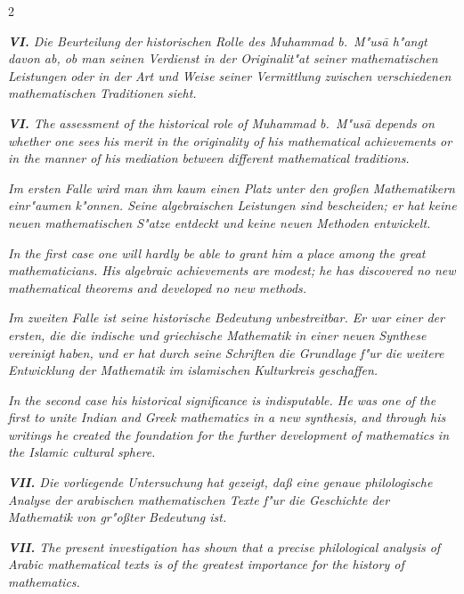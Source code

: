 \documentclass[10pt,a4paper]{article}
\begin{document}
\begin{paracol}{2}
\switchcolumn*

\textit{\textbf{VI.} Die Beurteilung der historischen Rolle des Muhammad b.\ M"us\=a h"angt davon ab, ob man seinen Verdienst in der Originalit"at seiner mathematischen Leistungen oder in der Art und Weise seiner Vermittlung zwischen verschiedenen mathematischen Traditionen sieht.}

\switchcolumn

\textit{\textbf{VI.} The assessment of the historical role of Muhammad b.\ M"us\=a depends on whether one sees his merit in the originality of his mathematical achievements or in the manner of his mediation between different mathematical traditions.}

\switchcolumn*

\textit{Im ersten Falle wird man ihm kaum einen Platz unter den gro\ss{}en Mathematikern einr"aumen k"onnen. Seine algebraischen Leistungen sind bescheiden; er hat keine neuen mathematischen S"atze entdeckt und keine neuen Methoden entwickelt.}

\switchcolumn

\textit{In the first case one will hardly be able to grant him a place among the great mathematicians. His algebraic achievements are modest; he has discovered no new mathematical theorems and developed no new methods.}

\switchcolumn*

\textit{Im zweiten Falle ist seine historische Bedeutung unbestreitbar. Er war einer der ersten, die die indische und griechische Mathematik in einer neuen Synthese vereinigt haben, und er hat durch seine Schriften die Grundlage f"ur die weitere Entwicklung der Mathematik im islamischen Kulturkreis geschaffen.}

\switchcolumn

\textit{In the second case his historical significance is indisputable. He was one of the first to unite Indian and Greek mathematics in a new synthesis, and through his writings he created the foundation for the further development of mathematics in the Islamic cultural sphere.}

\switchcolumn*

\textit{\textbf{VII.} Die vorliegende Untersuchung hat gezeigt, da\ss{} eine genaue philologische Analyse der arabischen mathematischen Texte f"ur die Geschichte der Mathematik von gr"o\ss{}ter Bedeutung ist.}

\switchcolumn

\textit{\textbf{VII.} The present investigation has shown that a precise philological analysis of Arabic mathematical texts is of the greatest importance for the history of mathematics.}


\end{paracol}
\end{document}
